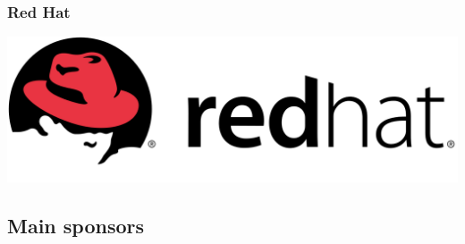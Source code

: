 \documentclass[aspectratio=169]{beamer}
\begin{document}
\begin{frame}
	\frametitle{Red Hat}
	\vfill
		\includegraphics[scale=0.25]{images/red_hat.png}
	\vfill
\end{frame}


\subsection{Main sponsors}
\end{document}
